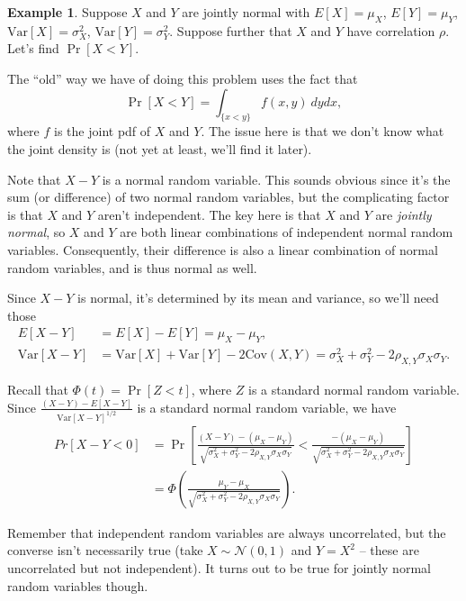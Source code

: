 \documentclass[12pt]{article}
\theoremstyle{plain}
\theoremstyle{definition}
\newtheorem{example}[theorem]{Example}
\theoremstyle{remark}
\newcommand{\Var}{\ensuremath{\textrm{Var}}}
\newcommand{\Cov}{\ensuremath{\textrm{Cov}}}
\begin{document}
\begin{example}
    Suppose $X$ and $Y$ are jointly normal with $E[X] = \mu_X$, $E[Y] = \mu_Y$, $\Var[X] = \sigma_X^2$, $\Var[Y] = \sigma_Y^2$.
    Suppose further that $X$ and $Y$ have correlation $\rho$.
    Let's find $\Pr[X<Y]$.

    The ``old'' way we have of doing this problem uses the fact that
    \[
        \Pr[X<Y] = \int_{\{x<y\}}f(x,y)\ dydx,
    \]
    where $f$ is the joint pdf of $X$ and $Y$.
    The issue here is that we don't know what the joint density is (not yet at least, we'll find it later).

    Note that $X-Y$ is a normal random variable.
    This sounds obvious since it's the sum (or difference) of two normal random variables, but the complicating factor is that $X$ and $Y$ aren't independent.
    The key here is that $X$ and $Y$ are \emph{jointly normal}, so $X$ and $Y$ are both linear combinations of independent normal random variables.
    Consequently, their difference is also a linear combination of normal random variables, and is thus normal as well.

    Since $X-Y$ is normal, it's determined by its mean and variance, so we'll need those
    \begin{align*}
        E[X-Y] &= E[X]-E[Y] = \mu_X-\mu_Y,\\
        \Var[X-Y]&= \Var[X] + \Var[Y] - 2\Cov(X,Y) = \sigma_X^2 + \sigma_Y^2 - 2\rho_{X,Y}\sigma_X\sigma_Y.
    \end{align*}

    Recall that $\Phi(t) = \Pr[Z<t]$, where $Z$ is a standard normal random variable.
    Since $\frac{(X-Y)-E[X-Y]}{\Var[X-Y]^{1/2}}$ is a standard normal random variable, we have
    \begin{align*}
        Pr[X-Y<0] &= \Pr\left[\frac{(X-Y)-(\mu_X-\mu_Y)}{\sqrt{\sigma_X^2+\sigma_Y^2-2\rho_{X,Y}\sigma_X\sigma_Y}} < \frac{-(\mu_X-\mu_Y)}{\sqrt{\sigma_X^2+\sigma_Y^2-2\rho_{X,Y}\sigma_X\sigma_Y}}\right]\\
        &= \Phi\left(\frac{\mu_Y-\mu_X}{\sqrt{\sigma_X^2+\sigma_Y^2-2\rho_{X,Y}\sigma_X\sigma_Y}}\right).
    \end{align*}

\end{example}

Remember that independent random variables are always uncorrelated, but the converse isn't necessarily true (take $X\sim \mathcal{N}(0,1)$ and $Y = X^2$ -- these are uncorrelated but not independent).
It turns out to be true for jointly normal random variables though.
\end{document}
